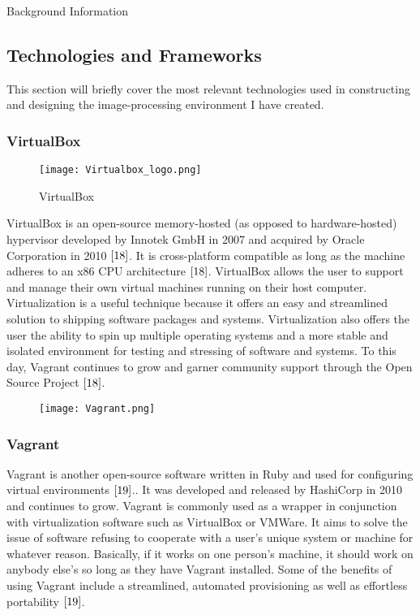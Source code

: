 \documentclass[a4paper,12pt]{article}
\begin{document}
\begin{section}{Background Information}
\newpage
\subsection{Technologies and Frameworks}

This section will briefly cover the most relevant technologies used in constructing and designing the image-processing environment I have created.

\singlespacing

\subsubsection{VirtualBox}


\begin{wrapfigure}{L}{0.5\textwidth}
\centering
\texttt{[image: Virtualbox\_logo.png]}
\caption{VirtualBox}
\end{wrapfigure}

VirtualBox is an open-source memory-hosted (as opposed to hardware-hosted) hypervisor developed by Innotek GmbH in 2007 and acquired by Oracle Corporation in 2010 $\cite{18}$. 
It is cross-platform compatible as long as the machine adheres to an x86 CPU architecture $\cite{18}$. VirtualBox allows the user to support and manage their own virtual machines running on their host computer. Virtualization is a useful technique because it offers an easy and streamlined solution to shipping software packages and systems. Virtualization also offers the user the ability to spin up multiple operating systems and a more stable and isolated environment for testing and stressing of software and systems. To this day, Vagrant continues to grow and garner community support through the Open Source Project $\cite{18}$.

\begin{wrapfigure}{R}{0.2\textwidth}
\begin{center}
\texttt{[image: Vagrant.png]}
\end{center}
\end{wrapfigure}

\subsubsection{Vagrant}

Vagrant is another open-source software written in Ruby and used for configuring virtual environments $\cite{19}$.. It was developed and released by HashiCorp in 2010 and continues to grow. Vagrant is commonly used as a wrapper in conjunction with virtualization software such as VirtualBox or VMWare. It aims to solve the issue of software refusing to cooperate with a user's unique system or machine for whatever reason. Basically, if it works on one person's machine, it should work on anybody else's so long as they have Vagrant installed. Some of the benefits of using Vagrant include a streamlined, automated provisioning as well as effortless portability $\cite{19}$. 


\end{section}
\end{document}
